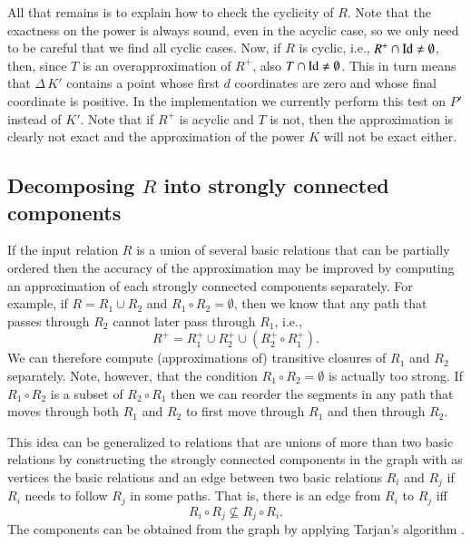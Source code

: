 All that remains is to explain how to check the cyclicity of $R$.
Note that the exactness on the power is always sound, even
in the acyclic case, so we only need to be careful that we find
all cyclic cases.  Now, if $R$ is cyclic, i.e.,
$R^+ \cap \mathop{\rm Id}\nolimits \ne \emptyset$, then, since $T$ is
an overapproximation of $R^+$, also
$T \cap \mathop{\rm Id}\nolimits \ne \emptyset$.  This in turn means
that $\Delta \, K'$ contains a point whose first $d$ coordinates
are zero and whose final coordinate is positive.
In the implementation we currently perform this test on $P'$ instead of $K'$.
Note that if $R^+$ is acyclic and $T$ is not, then the approximation
is clearly not exact and the approximation of the power $K$
will not be exact either.

\subsection{Decomposing $R$ into strongly connected components}

If the input relation $R$ is a union of several basic relations
that can be partially ordered
then the accuracy of the approximation may be improved by computing
an approximation of each strongly connected components separately.
For example, if $R = R_1 \cup R_2$ and $R_1 \circ R_2 = \emptyset$,
then we know that any path that passes through $R_2$ cannot later
pass through $R_1$, i.e.,
\begin{equation}
\label{eq:transitive:components}
R^+ = R_1^+ \cup R_2^+ \cup \left(R_2^+ \circ R_1^+\right)
.
\end{equation}
We can therefore compute (approximations of) transitive closures
of $R_1$ and $R_2$ separately.
Note, however, that the condition $R_1 \circ R_2 = \emptyset$
is actually too strong.
If $R_1 \circ R_2$ is a subset of $R_2 \circ R_1$
then we can reorder the segments
in any path that moves through both $R_1$ and $R_2$ to
first move through $R_1$ and then through $R_2$.

This idea can be generalized to relations that are unions
of more than two basic relations by constructing the
strongly connected components in the graph with as vertices
the basic relations and an edge between two basic relations
$R_i$ and $R_j$ if $R_i$ needs to follow $R_j$ in some paths.
That is, there is an edge from $R_i$ to $R_j$ iff
\begin{equation}
\label{eq:transitive:edge}
R_i \circ R_j
\not\subseteq
R_j \circ R_i
.
\end{equation}
The components can be obtained from the graph by applying
Tarjan's algorithm \parencite{Tarjan1972}.

